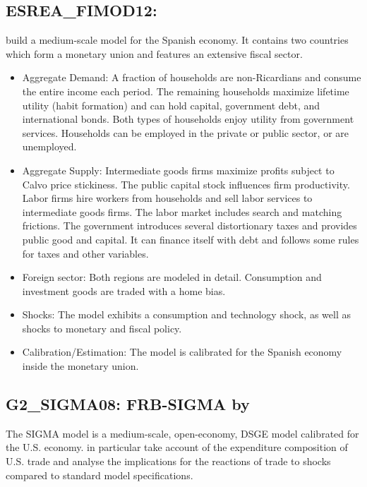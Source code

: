 \documentclass[11pt,a4paper]{article}
\begin{document}
	\subsection{ESREA\_FIMOD12: \cite{stahler2012fimod}}
	\label{ESREAFIMOD12}
	\cite{stahler2012fimod} build a medium-scale model for the Spanish economy. It contains two countries which form a monetary union and features an extensive fiscal sector.
	\begin{itemize}
	\item Aggregate Demand: A fraction of households are non-Ricardians and consume the entire income each period. The remaining households maximize lifetime utility (habit formation) and can hold capital, government debt, and international bonds. Both types of households enjoy utility from government services. Households can be employed in the private or public sector, or are unemployed. 
	
	\item Aggregate Supply: Intermediate goods firms maximize profits subject to Calvo price stickiness. The public capital stock influences firm productivity. Labor firms hire workers from households and sell labor services to intermediate goods firms. The labor market includes search and matching frictions. The government introduces several distortionary taxes and provides public good and capital. It can finance itself with debt and follows some rules for taxes and other variables.
	
	\item Foreign sector: Both regions are modeled in detail. Consumption and investment goods are traded with a home bias.
	
	\item Shocks: The model exhibits a consumption and technology shock, as well as shocks to monetary and fiscal policy.
	
	\item Calibration/Estimation: The model is calibrated for the Spanish economy inside the monetary union.
	\end{itemize}
	
	
	\subsection{G2\_SIGMA08: FRB-SIGMA by \cite{ErcegGuerrieriGust2008}}
	\label{G2SIGMA08}
	The SIGMA model is a medium-scale, open-economy, DSGE model calibrated for the U.S. economy. \cite{ErcegGuerrieriGust2008} in particular take account of the expenditure composition of U.S. trade and analyse the implications for the reactions of trade to shocks compared to standard model specifications.
	
\end{document}
